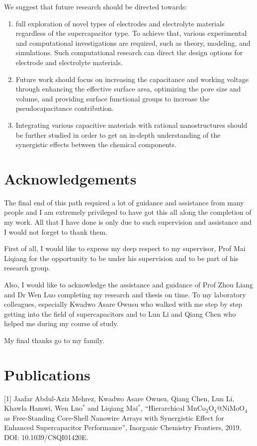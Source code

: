 \documentclass[reprint,amsmath,amssymb,aps,floatfix,
]{revtex4-2}
\begin{document}
We suggest that future research should be directed towards: 
\begin{enumerate}
    \item full exploration of novel types of electrodes and electrolyte materials regardless of the supercapacitor type. To achieve that, various experimental and computational investigations are required, such as theory, modeling, and simulations. Such computational research can direct the design options for electrode and electrolyte materials.
    \item Future work should focus on increasing the capacitance and working voltage through enhancing the effective surface area, optimizing the pore size and volume, and providing surface functional groups to increase the pseudocapacitance contribution.
    \item Integrating various capacitive materials with rational nanostructures should be further studied in order to get an in-depth understanding of the synergistic effects between the chemical components.
\end{enumerate}

\onecolumngrid
\newpage
\section*{\label{sec:level1}A\lowercase{cknowledgements}}
The final end of this path required a lot of guidance and assistance from many people and I am extremely privileged to have got this all along the completion of my work. All that I have done is only due to such supervision and assistance and I would not forget to thank them.

First of all, I would like to express my deep respect to my supervisor, Prof Mai Liqiang for the opportunity to be under his supervision and to be part of his research group.

Also, I would like to acknowledge the assistance and guidance of Prof Zhou Liang and Dr Wen Luo completing my research and thesis on time.
To my laboratory colleagues, especially Kwadwo Asare Owusu who walked with me step by step getting into the field of supercapacitors and to Lun Li and Qiang Chen who helped me during my course of study.

My final thanks go to my family.
\newpage
\section*{\label{sec:level1}P\lowercase{ublications}}
[1] Jaafar Abdul-Aziz Mehrez, Kwadwo Asare Owusu, Qiang Chen, Lun Li, Khawla Hamwi, Wen Luo$^*$ and Liqiang Mai$^*$, “Hierarchical MnCo$_2$O$_4$@NiMoO$_4$ as Free-Standing Core-Shell Nanowire Arrays with Synergistic Effect for Enhanced Supercapacitor Performance”, Inorganic Chemistry Frontiers, 2019. DOI: 10.1039/C8QI01420E.
\end{document}
